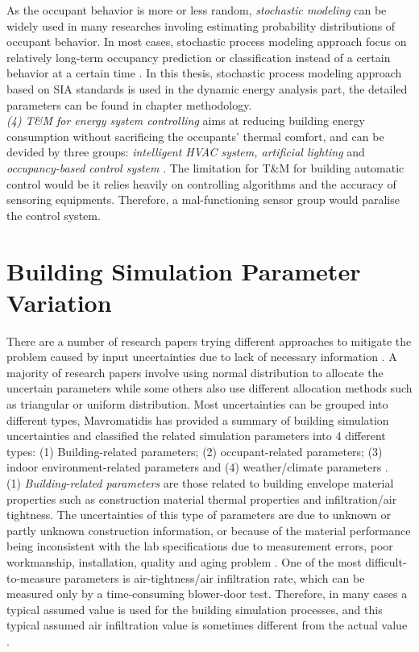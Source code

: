 \documentclass[a4paper, oneside]{discothesis}
\begin{document}
			As the occupant behavior is more or less random, \textit{stochastic modeling} can be widely used in many researches involing estimating probability distributions of occupant behavior. In most cases, stochastic process modeling approach focus on relatively long-term occupancy prediction or classification instead of a certain behavior at a certain time \cite{ZOU2018165}.
			In this thesis, stochastic process modeling approach based on SIA standards is used in the dynamic energy analysis part, the detailed parameters can be found in chapter methodology.\\

			\textit{(4) T\&M for energy system controlling} aims at reducing building energy consumption without sacrificing the occupants' thermal comfort, and can be devided by three groups: \textit{intelligent HVAC system, artificial lighting} and \textit{occupancy-based control system} \cite{ZOU2018165,hong2015review}. The limitation for T\&M for building automatic control would be it relies heavily on controlling algorithms and the accuracy of sensoring equipments. Therefore, a mal-functioning sensor group would paralise the control system.

	\section{Building Simulation Parameter Variation}
		There are a number of research papers trying different approaches to mitigate the problem caused by input uncertainties due to lack of necessary information \cite{GeorgeThesis}. A majority of research papers involve using normal distribution to allocate the uncertain parameters while some others also use different allocation methods such as triangular or uniform distribution. Most uncertainties can be grouped into different types, Mavromatidis \cite{GeorgeThesis} has provided a summary of building simulation uncertainties and classified the related simulation parameters into 4 different types: (1) Building-related parameters; (2) occupant-related parameters; (3) indoor environment-related parameters and (4) weather/climate parameters \cite{GeorgeThesis}.\\

		(1) \textit{Building-related parameters} are those related to building envelope material properties such as construction material thermal properties and infiltration/air tightness. The uncertainties of this type of parameters are due to unknown or partly unknown construction information, or because of the material performance being inconsistent with the lab specifications due to measurement errors, poor workmanship, installation, quality and aging problem \cite{GeorgeThesis}. One of the most difficult-to-measure parameters is air-tightness/air infiltration rate, which can be measured only by a time-consuming blower-door test. Therefore, in many cases a typical assumed value is used for the building simulation processes, and this typical assumed air infiltration value is sometimes different from the actual value \cite{GeorgeThesis,burhenne2013uncertainty}.\\
\end{document}

